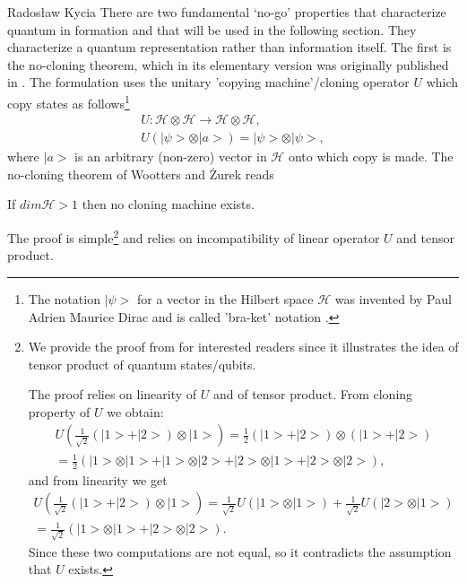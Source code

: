 \begin{artengenv}{Radosław Kycia}
There are two fundamental `no-go' properties that characterize quantum in formation and that will be used in the following section. They characterize a quantum representation rather than information itself. The first is the no-cloning theorem, which in its elementary version was originally published in \parencite{NoCloning_WootersZurek}. The formulation uses the unitary 'copying machine'/cloning operator $U$ which copy states as follows\footnote{The notation $|\psi>$ for a vector in the Hilbert space $\mathcal{H}$ was invented by Paul Adrien Maurice Dirac and is called 'bra-ket' notation \parencite{QuantumComputing}.}
\begin{equation}
 \begin{array}{c}
  U: \mathcal{H} \otimes \mathcal{H} \rightarrow \mathcal{H}\otimes \mathcal{H}, \\
  U( | \psi> \otimes |a >) = | \psi> \otimes |\psi >,
 \end{array}
\end{equation}
where $|a>$ is an arbitrary (non-zero) vector in $\mathcal{H}$ onto which copy is made. The no-cloning theorem of Wootters and \.{Z}urek reads
\begin{Theorem}
\label{Th.NoClonning}
 If $dim\mathcal{H}>1$ then no cloning machine exists.
\end{Theorem}

The proof is simple\footnote{
We provide the proof from \parencite{NoCloning_WootersZurek} for interested readers since it illustrates the idea of tensor product of quantum states/qubits.

 The proof relies on linearity of $U$ and of tensor product. From cloning property of $U$ we obtain:
 \begin{equation}
 \begin{array}{c}
  U\left( \frac{1}{\sqrt{2}}(|1>+|2>)\otimes|1>\right)  =  \frac{1}{2}(|1>+|2>)\otimes(|1>+|2>) \\ 
  =\frac{1}{2}(|1>\otimes|1>+|1>\otimes|2>+|2>\otimes|1>+|2>\otimes|2>),
 \end{array}
 \end{equation}
and from linearity we get
\begin{equation}
\begin{array}{c}
 U\left( \frac{1}{\sqrt{2}}(|1>+|2>)\otimes|1>\right)  = \frac{1}{\sqrt{2}} U(|1>\otimes |1>) + \frac{1}{\sqrt{2}} U(|2>\otimes |1>)  \\ 
  =\frac{1}{\sqrt{2}}(|1>\otimes|1>+|2>\otimes|2>).
\end{array}
\end{equation}
Since these two computations are not equal, so it contradicts the assumption that $U$ exists.
} and relies on incompatibility of linear operator $U$ and tensor product.



\end{artengenv}

